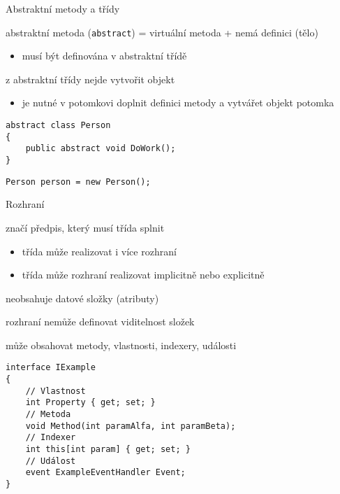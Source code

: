\begin{frame}[fragile]
\begin{bitemize}{Abstraktní metody a třídy}
\item abstraktní metoda (\lstinline|abstract|) = virtuální metoda + nemá definici (tělo)
\begin{itemize}
\item musí být definována v abstraktní třídě
\end{itemize}
\item z abstraktní třídy nejde vytvořit objekt
\begin{itemize}
\item je nutné v potomkovi doplnit definici metody a vytvářet objekt potomka
\end{itemize}
\end{bitemize}
\vfill
\begin{yesblock}
\begin{lstlisting}[basicstyle=\small]
abstract class Person
{
    public abstract void DoWork();
}
\end{lstlisting}
\end{yesblock}
\vfill
\begin{noblock}
\begin{lstlisting}[basicstyle=\small]
Person person = new Person();
\end{lstlisting}
\end{noblock}
\end{frame}






\begin{frame}[fragile]
\begin{bitemize}{Rozhraní}
\item značí předpis, který musí třída splnit
\begin{itemize}
\item třída může realizovat i více rozhraní
\item třída může rozhraní realizovat implicitně nebo explicitně
\end{itemize}
\item neobsahuje datové složky (atributy)
\item rozhraní nemůže definovat viditelnost složek
\item může obsahovat metody, vlastnosti, indexery, události
\end{bitemize}
\vfill
\begin{yesblock}
\begin{lstlisting}[basicstyle=\small]
interface IExample
{
    // Vlastnost
    int Property { get; set; }
    // Metoda
    void Method(int paramAlfa, int paramBeta);
    // Indexer
    int this[int param] { get; set; }
    // Událost
    event ExampleEventHandler Event;
}
\end{lstlisting}
\end{yesblock}
\end{frame}



